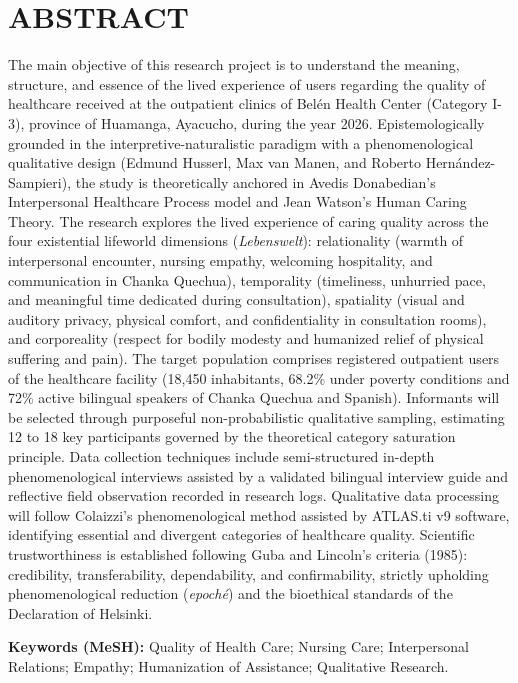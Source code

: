 \section*{ABSTRACT}

\noindent The main objective of this research project is to understand the meaning, structure, and essence of the lived experience of users regarding the quality of healthcare received at the outpatient clinics of Belén Health Center (Category I-3), province of Huamanga, Ayacucho, during the year 2026. Epistemologically grounded in the interpretive-naturalistic paradigm with a phenomenological qualitative design (Edmund Husserl, Max van Manen, and Roberto Hernández-Sampieri), the study is theoretically anchored in Avedis Donabedian's Interpersonal Healthcare Process model and Jean Watson's Human Caring Theory. The research explores the lived experience of caring quality across the four existential lifeworld dimensions (\textit{Lebenswelt}): relationality (warmth of interpersonal encounter, nursing empathy, welcoming hospitality, and communication in Chanka Quechua), temporality (timeliness, unhurried pace, and meaningful time dedicated during consultation), spatiality (visual and auditory privacy, physical comfort, and confidentiality in consultation rooms), and corporeality (respect for bodily modesty and humanized relief of physical suffering and pain). The target population comprises registered outpatient users of the healthcare facility (18,450 inhabitants, 68.2\% under poverty conditions and 72\% active bilingual speakers of Chanka Quechua and Spanish). Informants will be selected through purposeful non-probabilistic qualitative sampling, estimating 12 to 18 key participants governed by the theoretical category saturation principle. Data collection techniques include semi-structured in-depth phenomenological interviews assisted by a validated bilingual interview guide and reflective field observation recorded in research logs. Qualitative data processing will follow Colaizzi's phenomenological method assisted by ATLAS.ti v9 software, identifying essential and divergent categories of healthcare quality. Scientific trustworthiness is established following Guba and Lincoln's criteria (1985): credibility, transferability, dependability, and confirmability, strictly upholding phenomenological reduction (\textit{epoché}) and the bioethical standards of the Declaration of Helsinki.

\vspace{0.8cm}
\noindent \textbf{Keywords (MeSH):} Quality of Health Care; Nursing Care; Interpersonal Relations; Empathy; Humanization of Assistance; Qualitative Research.

\newpage
